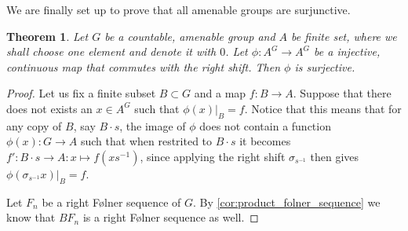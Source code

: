 \documentclass[titlepage, a4paper]{article}
\theoremstyle{theoremdd}
\newtheorem{theorem}{Theorem}[section]
\theoremstyle{definitiondd}
\theoremstyle{remarkdd}
\begin{document}
We are finally set up to prove that all amenable groups are surjunctive.
\begin{theorem}
	Let $G$ be a countable, amenable group and  $A$ be finite set, where we shall choose one element and denote it with $0$. Let  $\phi: A^{G} \to A^{G}$ be a injective, continuous map that commutes with the right shift. Then $\phi$ is surjective.
\end{theorem}

\begin{proof}
	Let us fix a finite subset $B \subset G$ and a map $f:B\to A$. 
	Suppose that there does not exists an $x \in A^{G}$ such that $\phi(x)|_B = f$.
	Notice that this means that for any copy of $B$, say  $B\cdot s$, the image of $\phi$ does not contain a function  $\phi(x): G \to A$ such that when restrited to  $B\cdot s$ it becomes $f': B\cdot s \to A: x \mapsto f\left( x s^{-1} \right) $, since applying the right shift $\sigma_{s^{-1}}$ then gives $\phi(\sigma_{s^{-1}} x) |_{B} = f$.

	Let $F_n$ be a right Følner sequence of $G$. By \cref{cor:product_folner_sequence} we know that $BF_n$ is a right Følner sequence as well. 


\end{proof}
\end{document}
